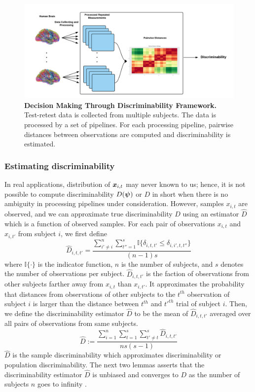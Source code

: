 \documentclass{article}
\begin{document}
\begin{figure}[ht!]
	\includegraphics[width=\linewidth]{../Figs/flow_chart.png}
	\caption{{\bf Decision Making Through Discriminability Framework.} Test-retest data is collected from multiple subjects. The data is processed by a set of pipelines. For each processing pipeline, pairwise distances between observations are computed and discriminability is estimated. }
	\label{fig:fc}
\end{figure}

\subsubsection{Estimating discriminability}
In real applications, distribution of $\boldsymbol{x}_{i,t}$ may never known to us; hence, it is not possible to compute discriminability $D(\boldsymbol{\psi})$ or $D$ in short when there is no ambiguity in processing pipelines under consideration. However, samples $x_{i,t}$ are observed, and we can approximate true discriminability $D$ using an estimator $\hat{D}$ which is a function of observed samples. For each pair of observations $x_{i,t}$ and $x_{i,t'}$ from subject $i$, we first define
\[ \hat{D}_{i,t,t'} = \frac{\sum\limits_{i' \neq i}^{n} \sum\limits_{t''=1}^{s} \mathbb{I}\{\delta_{i,t,t'} \leq \delta_{i,i',t,t''} \} }{(n-1)s}\]
where $\mathbb{I}\{ \cdot \} $ is the indicator function, $n$ is the number of subjects, and $s$ denotes the number of observations per subject. $\hat{D}_{i,t,t'}$ is the faction of observations from other subjects farther away from $x_{i,t}$ than $x_{i,t'}$. It approximates the probability that distances from observations of other subjects to the $t^{th}$ observation of subject $i$ is larger than the distance between $t^{th}$ and $t'^{th}$ trial of subject $i$. Then, we define the discriminability estimator $\hat{D}$ to be the mean of $\hat{D}_{i,t,t'}$ averaged over all pairs of observations from same subjects.
\[ \hat{D} := \frac{\sum\limits_{i=1}^{n} \sum\limits_{t=1}^{s}  \sum\limits_{t' \neq t}^{s} \hat{D}_{i,t,t'}}{ns(s-1)} \]
$\hat{D}$ is the sample discriminability which approximates discriminability or population discriminability. The next two lemmas asserts that the discriminability estimator $\hat{D}$ is unbiased and converges to $D$ as the number of subjects $n$ goes to infinity \cite{bickel2015mathematical}.
\end{document}
